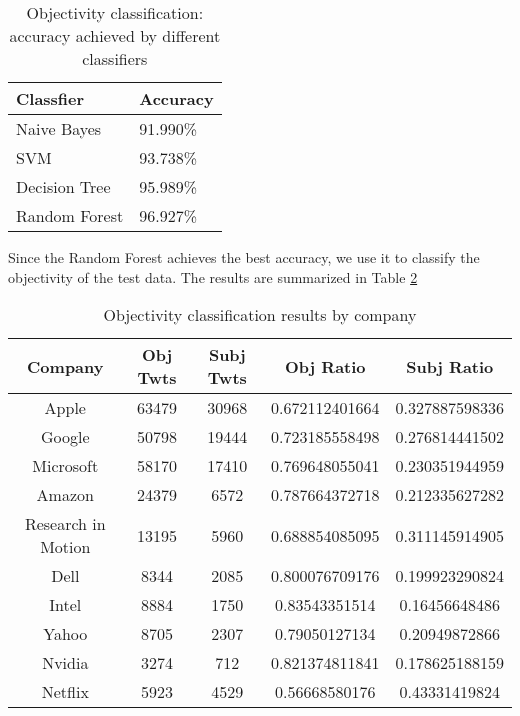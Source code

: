 \documentclass[12pt]{article}
\begin{document}
\begin{table}
\begin{center}
    \begin{tabular}{ | l || l | }
        \hline
        \textbf{Classfier} &  \textbf{Accuracy} \\ \hline
        \hline
        Naive Bayes &  91.990\% \\ \hline
        SVM & 93.738\% \\ \hline
        Decision Tree & 95.989\% \\ \hline
        Random Forest & 96.927\% \\ \hline
    \end{tabular}
\caption{Objectivity classification: accuracy achieved by different classifiers}
\label{classifiers-obj}
\end{center}
\end{table}

Since the Random Forest achieves the best accuracy, we use it to classify the objectivity of the test data. The results are summarized in Table \ref{objectivity-by-company}

\begin{table}
\begin{center}
    \begin{tabular}{ | c || c | c | c | c | }
        \hline
        \textbf{Company} &  \textbf{Obj Twts} & \textbf{Subj Twts} & \textbf{Obj Ratio} & \textbf{Subj Ratio} \\ \hline
        \hline
        Apple &  63479 & 30968 & 0.672112401664 & 0.327887598336 \\ \hline
        Google &  50798 & 19444 & 0.723185558498 & 0.276814441502 \\ \hline
        Microsoft &  58170 & 17410 & 0.769648055041 & 0.230351944959 \\ \hline
        Amazon &  24379 & 6572 & 0.787664372718 & 0.212335627282 \\ \hline
        Research in Motion &  13195 & 5960 & 0.688854085095 & 0.311145914905 \\ \hline
        Dell &  8344 & 2085 & 0.800076709176 & 0.199923290824 \\ \hline
        Intel &  8884 & 1750 & 0.83543351514 & 0.16456648486 \\ \hline
        Yahoo &  8705 & 2307 & 0.79050127134 & 0.20949872866 \\ \hline
        Nvidia &  3274 & 712 & 0.821374811841 & 0.178625188159 \\ \hline
        Netflix &  5923 & 4529 & 0.56668580176 & 0.43331419824 \\ \hline
    \end{tabular}
\caption{Objectivity classification results by company}
\label{objectivity-by-company}
\end{center}
\end{table}
\end{document}
